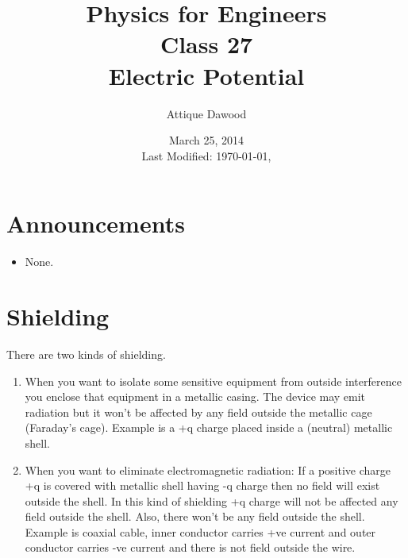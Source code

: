\documentclass[12pt,a4paper]{article}
\title{\vspace{-3cm}Physics for Engineers\\Class 27\\Electric Potential}
\author{Attique Dawood}
\date{March 25, 2014\\[0.2cm] Last Modified: \today, \currenttime}
\begin{document}
\maketitle
\section{Announcements}
\begin{itemize}
\item None.
\end{itemize}
\section{Shielding}
There are two kinds of shielding.
\begin{enumerate}
\item When you want to isolate some sensitive equipment from outside interference you enclose that equipment in a metallic casing. The device may emit radiation but it won't be affected by any field outside the metallic cage (Faraday's cage). Example is a +q charge placed inside a (neutral) metallic shell.
\item When you want to eliminate electromagnetic radiation: If a positive charge +q is covered with metallic shell having -q charge then no field will exist outside the shell. In this kind of shielding +q charge will not be affected any field outside the shell. Also, there won't be any field outside the shell. Example is coaxial cable, inner conductor carries +ve current and outer conductor carries -ve current and there is not field outside the wire.
\end{enumerate}
\end{document}
